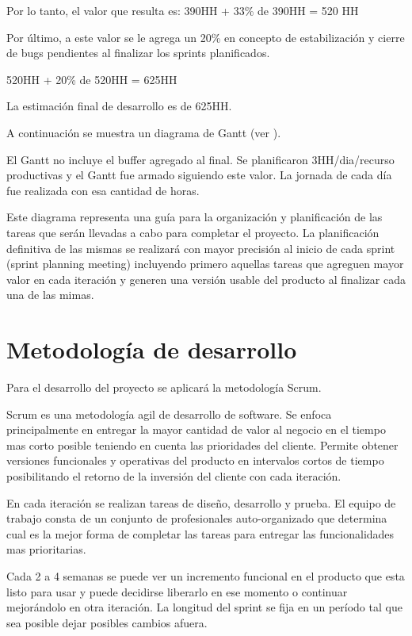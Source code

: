 \documentclass[12pt,a4paper]{article}
\begin{document}
	Por lo tanto, el valor que resulta es: 390HH + 33\% de 390HH = 520 HH

	Por último, a este valor se le agrega un 20\% en concepto de estabilización y cierre de bugs pendientes al finalizar los sprints planificados.

	520HH + 20\% de 520HH = 625HH

	La estimación final de desarrollo es de 625HH.

	A continuación se muestra un diagrama de Gantt (ver \cite{gantt}).


	El Gantt no incluye el buffer agregado al final. Se planificaron 3HH/dia/recurso productivas y el Gantt fue armado siguiendo este valor. La jornada de cada día fue realizada con esa cantidad de horas.

	Este diagrama representa una guía para la organización y planificación de las tareas que serán llevadas a cabo para completar el proyecto. La planificación definitiva de las mismas se realizará con mayor precisión al inicio de cada sprint (sprint planning meeting) incluyendo primero aquellas tareas que agreguen mayor valor en cada iteración y generen una versión usable del producto al finalizar cada una de las mimas.

	\section{Metodología de desarrollo}
	
	Para el desarrollo del proyecto se aplicará la metodología Scrum.

	Scrum es una metodología agil de desarrollo de software. Se enfoca principalmente en entregar la mayor cantidad de valor al negocio en el tiempo mas corto posible teniendo en cuenta las prioridades del cliente. Permite obtener versiones funcionales y operativas del producto en intervalos cortos de tiempo posibilitando el retorno de la inversión del cliente con cada iteración.
	
	En cada iteración se realizan tareas de diseño, desarrollo y prueba. El equipo de trabajo consta de un conjunto de profesionales auto-organizado que determina cual es la mejor forma de completar las tareas para entregar las funcionalidades mas prioritarias.
	
	Cada 2 a 4 semanas se puede ver un incremento funcional en el producto que esta listo para usar y puede decidirse liberarlo en ese momento o continuar mejorándolo en otra iteración. La longitud del sprint se fija en un período tal que sea posible dejar posibles cambios afuera.
\end{document}

